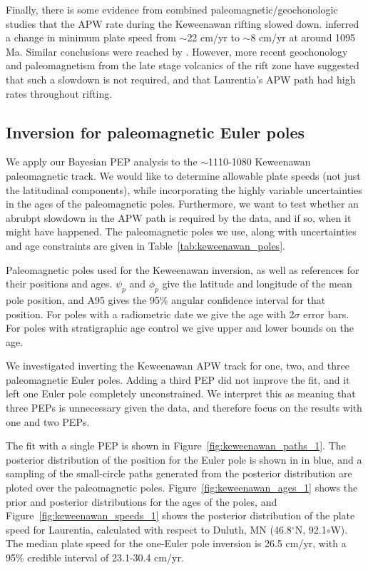 \documentclass[preprint,12pt,authoryear]{elsarticle}
\begin{document}
Finally, there is some evidence from combined paleomagnetic/geochonologic studies that
the APW rate during the Keweenawan rifting slowed down.
\citet{davis1997geochronology} inferred a change in minimum plate speed from $\sim$22 cm/yr
to $\sim$8 cm/yr at around 1095 Ma. Similar conclusions were reached by \citet{swanson2009no}.
However, more recent geochonology and paleomagnetism from the late stage volcanics
of the rift zone \citep{fairchild2016end} have suggested that such a
slowdown is not required, and that Laurentia's APW path had high rates throughout rifting.

\subsection{Inversion for paleomagnetic Euler poles}

We apply our Bayesian PEP analysis to the $\sim$1110-1080 Keweenawan paleomagnetic track.
We would like to determine allowable plate speeds (not just the latitudinal components), while
incorporating the highly variable uncertainties in the ages of the paleomagnetic poles.
Furthermore, we want to test whether an abrubpt slowdown in the APW path is required by the data,
and if so, when it might have happened.
The paleomagnetic poles we use, along with uncertainties and age constraints are given in Table~\ref{tab:keweenawan_poles}.

\begin{landscape}
\begin{table}
\scriptsize

\caption{Paleomagnetic poles used for the Keweenawan inversion, as well as references for their positions and ages. 
$\psi_p$ and $\phi_p$ give the latitude and longitude of the mean pole position, and A95 gives the 95\% angular confidence interval for that position.
For poles with a radiometric date we give the age with 2$\sigma$ error bars.
For poles with stratigraphic age control we give upper and lower bounds on the age.}
\label{tab:keweenawan_poles}
\end{table}
\end{landscape}

We investigated inverting the Keweenawan APW track for one, two, and three paleomagnetic Euler poles.
Adding a third PEP did not improve the fit, and it left one Euler pole completely unconstrained.
We interpret this as meaning that three PEPs is unnecessary given the data, and therefore focus
on the results with one and two PEPs.

The fit with a single PEP is shown in Figure~\ref{fig:keweenawan_paths_1}.
The posterior distribution of the position for the Euler pole is shown in in blue,
and a sampling of the small-circle paths generated from the posterior distribution are ploted over the paleomagnetic poles.
Figure~\ref{fig:keweenawan_ages_1} shows the prior and posterior distributions for the ages of the poles,
and Figure~\ref{fig:keweenawan_speeds_1} shows the posterior distribution of the plate speed for Laurentia,
calculated with respect to Duluth, MN (46.8$^\circ$N, 92.1$\circ$W).
The median plate speed for the one-Euler pole inversion is 26.5 cm/yr, with a 95\% credible interval of 23.1-30.4 cm/yr.
\end{document}
